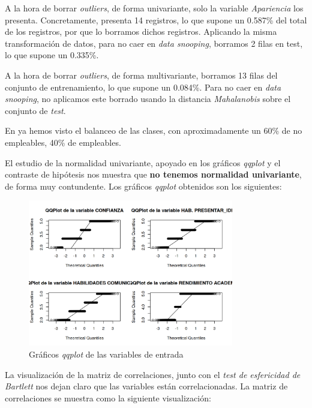 \documentclass[11pt]{article}
\begin{document}
A la hora de borrar \textit{outliers}, de forma univariante, solo la variable \textit{Apariencia} los presenta. Concretamente, presenta 14 registros, lo que supone un 0.587\% del total de los registros, por que lo borramos dichos registros. Aplicando la misma transformación de datos, para no caer en \textit{data snooping}, borramos 2 filas en test, lo que supone un 0.335\%.

A la hora de borrar \textit{outliers}, de forma multivariante, borramos 13 filas del conjunto de entrenamiento, lo que supone un 0.084\%. Para no caer en \textit{data snooping}, no aplicamos este borrado usando la distancia \textit{Mahalanobis} sobre el conjunto de \textit{test}.

En  ya hemos visto el balanceo de las clases, con aproximadamente un 60\% de no empleables, 40\% de empleables.

El estudio de la normalidad univariante, apoyado en los gráficos \textit{qqplot} y el contraste de hipótesis nos muestra que \textbf{no tenemos normalidad univariante}, de forma muy contundente. Los gráficos \textit{qqplot} obtenidos son los siguientes:

\begin{figure}[H]
    \centering
    \includegraphics[width=0.8\textwidth]{graficos_qqplot}
    \caption{Gráficos \textit{qqplot} de las variables de entrada}
\end{figure}

La visualización de la matriz de correlaciones, junto con el \textit{test de esfericidad de Bartlett} nos dejan claro que las variables están correlacionadas. La matriz de correlaciones se muestra como la siguiente visualización:
\end{document}
